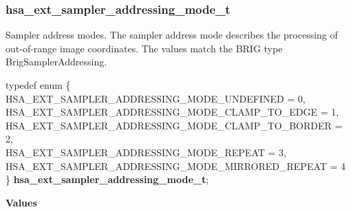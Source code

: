 \documentclass[final,oneside]{book}
\newcommand{\reftyp}[1]{#1}
\newcommand{\refenu}[1]{\reftyp{#1}}
\newenvironment{mylongtable}{\rowcolors{0}{lightgray}{lightgray}\longtable} {
\endlongtable}
\begin{document}
\subsubsection{hsa_\-ext_\-sampler_\-addressing_\-mode_\-t}
\vspace{-2.5mm}Sampler address modes. The sampler address mode describes the processing of out-of-range image coordinates. The values match the BRIG type BrigSamplerAddressing.\begin{mylongtable}{@{}p{\textwidth}}
\rule{0pt}{3ex}typedef enum \{\\\hspace{1.7em}\hypertarget{group__ext-images_1gga60a9fcdc1a1f338bd7e54445359fdf0fa4b02e9d069ed545eb3771b2a2c69ccb8}{\refenu{HSA_\-EXT_\-SAMPLER_\-ADDRESSING_\-MODE_\-UNDEFINED}} = 0,\\
\hspace{1.7em}\hypertarget{group__ext-images_1gga60a9fcdc1a1f338bd7e54445359fdf0faefb1f71d8741673081efd7fbb3141533}{\refenu{HSA_\-EXT_\-SAMPLER_\-ADDRESSING_\-MODE_\-CLAMP_\-TO_\-EDGE}} = 1,\\
\hspace{1.7em}\hypertarget{group__ext-images_1gga60a9fcdc1a1f338bd7e54445359fdf0faf9fe6a395063062f4b827610f0c38572}{\refenu{HSA_\-EXT_\-SAMPLER_\-ADDRESSING_\-MODE_\-CLAMP_\-TO_\-BORDER}} = 2,\\
\hspace{1.7em}\hypertarget{group__ext-images_1gga60a9fcdc1a1f338bd7e54445359fdf0facbb546d8b317e2e0af9b78fbfbc36b50}{\refenu{HSA_\-EXT_\-SAMPLER_\-ADDRESSING_\-MODE_\-REPEAT}} = 3,\\
\hspace{1.7em}\hypertarget{group__ext-images_1gga60a9fcdc1a1f338bd7e54445359fdf0faf4172b4d90cb5296e55885c7afa14bb6}{\refenu{HSA_\-EXT_\-SAMPLER_\-ADDRESSING_\-MODE_\-MIRRORED_\-REPEAT}} = 4\\
\} \hypertarget{group__ext-images_1ga60a9fcdc1a1f338bd7e54445359fdf0f}{\textbf{hsa_\-ext_\-sampler_\-addressing_\-mode_\-t}};\rule[-2ex]{0pt}{0pt}\end{mylongtable}\noindent\textbf{Values}\\[-7mm]
\end{document}
